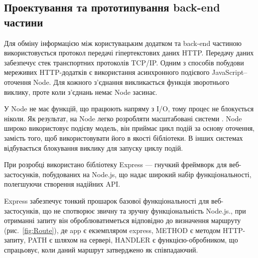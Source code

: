\subsection{Проектування та прототипування back-end частини}

Для обміну інформацією між користувацьким додатком та back-end частиною використовується протокол передачі гіпертекстових даних HTTP. Передачу даних забезпечує стек транспортних протоколів TCP/IP.
Одним з способів побудови мереживих HTTP-додатків є використання  асинхронного подієвого JavaScript–оточення Node. Для кожного з’єднання викликається функція зворотнього виклику, проте коли з’єднань немає Node засинає.

У Node не має функцій, що працюють напряму з I/O, тому процес не блокується ніколи. Як результат, на Node легко розробляти масштабовані системи \cite{zeiss2015node}.
Node широко використовує подієву модель, він приймає цикл подій за основу оточення, замість того, щоб використовувати його в якості бібліотеки. В інших системах відбувається блокування виклику для запуску циклу подій.

При розробці використано бібліотеку Express — гнучкий фреймворк для веб-застосунків, побудованих на Node.js, що надає широкий набір функціональності, полегшуючи створення надійних API.

Express забезпечує тонкий прошарок базової функціональності для веб-застосунків, що не спотворює звичну та зручну функціональність Node.js., при отриманні запиту він оброблюватиметься відповідно до визначення маршруту (рис.~\ref{fig:Route}), де app є екземпляром express, METHOD є методом HTTP-запиту, PATH є шляхом на сервері, HANDLER є функцією-обробником, що спрацьовує, коли даний маршрут затверджено як співпадаючий.
